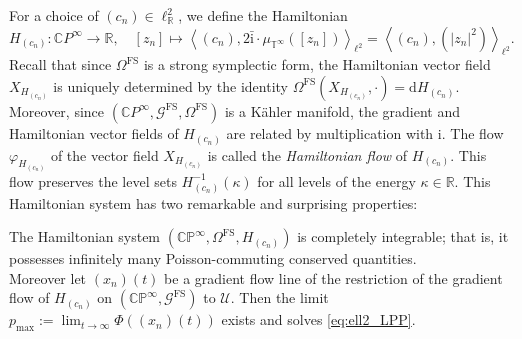 \documentclass[runningheads]{llncs}
\def\RR{\mathbb{R}}
\def\i{\mathrm{i}}
\begin{document}
For a choice of \( (c_n) \in \ell^2_{\RR} \), we define the Hamiltonian
\begin{equation}\label{eq defi Hamiltonian on CP}
    H_{(c_n)} : \mathbb{C}P^\infty \longrightarrow \mathbb{R}, \quad [z_n] \mapsto \left\langle (c_n), 2\bar{\i} \cdot \mu_{\mathbb{T}^\infty}([z_n]) \right\rangle_{\ell^2} = \left\langle (c_n), (|z_n|^2) \right\rangle_{\ell^2}.
\end{equation}
Recall that since \( \Omega^{\mathrm{FS}} \) is a strong symplectic form, the Hamiltonian vector field \( X_{H_{(c_n)}} \) is uniquely determined by the identity $\Omega^{\mathrm{FS}}(X_{H_{(c_n)}}, \cdot) = \mathrm{d}H_{(c_n)}.$
Moreover, since \( (\mathbb{C}P^\infty, \mathcal{G}^{\mathrm{FS}}, \Omega^{\mathrm{FS}}) \) is a Kähler manifold, the gradient and Hamiltonian vector fields of \( H_{(c_n)} \) are related by multiplication with \( \mathrm{i} \).
The flow \( \varphi_{H_{(c_n)}} \) of the vector field \( X_{H_{(c_n)}} \) is called the \emph{Hamiltonian flow} of \( H_{(c_n)} \). This flow preserves the level sets \( H_{(c_n)}^{-1}(\kappa) \) for all levels of the energy \( \kappa \in \mathbb{R} \).  
This Hamiltonian system has two remarkable and surprising properties:
\begin{theorem}\label{t: integrability of Hamiltonian system}
The Hamiltonian system \( (\mathbb{CP}^\infty, \Omega^{\mathrm{FS}}, H_{(c_n)}) \) is completely integrable; that is, it possesses infinitely many Poisson-commuting conserved quantities. \\
Moreover let \( (x_n)(t) \) be a gradient flow line of the restriction of the gradient flow of \( H_{(c_n)} \) on \( (\mathbb{CP}^\infty, \mathcal{G}^{\mathrm{FS}}) \) to \( \mathcal{U} \). Then the limit $p_{\max} := \lim_{t \to \infty} \varPhi\left((x_n)(t)\right)$ exists and solves \eqref{eq:ell2_LPP}.
\end{theorem}
\end{document}

